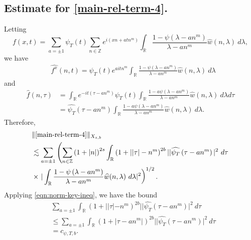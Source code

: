 \documentclass[12pt,reqno]{amsart}
\numberwithin{equation}{section}  %
\numberwithin{figure}{section}
\newcommand{\rr}{\mathbb{R}}
\newcommand{\zz}{\mathbb{Z}}
\newcommand{\wh}{\widehat}
\theoremstyle{plain}
\theoremstyle{definition}
\theoremstyle{remark}
\begin{document}
\subsection{Estimate for \eqref{main-rel-term-4}.}
Letting $$f(x,t) = \sum_{a = \pm 1} \psi_{T}(t) \sum_{n \in \zz} e^{i\left( xn +
atn^{m} \right)} 
\int_\rr \frac{1 - \psi\left( \lambda - an^{m} \right)}{\lambda - an^{m}} 
\wh{w} \left( n, \lambda \right) \ d \lambda,$$ we have
%
%
\begin{equation*}
	\begin{split}
		& \wh{f^x}(n, t) = \psi_{T}(t) e^{aitn^{m}} \int_\rr
		\frac{1 - \psi\left( \lambda - an^{m} \right)}{\lambda - an^{m}} 
		\wh{w}(n, \lambda) \ d \lambda
	\end{split}
\end{equation*}
and
\begin{equation*}
	\begin{split}
		 \wh{f}\left( n, \tau \right)
		 & = \int_\rr e^{-it\left( \tau - an^{m} 
		\right)} \psi_{T}(t) \int_\rr \frac{1 - a\psi\left( 
		\lambda - an^{m} 
		\right)}{\lambda - an^{m}} \wh{w}(n, \lambda) \ d \lambda d \tau
		\\
    & = \wh{\psi_{T}}\left( \tau - an^{m} \right) \int_\rr 
		\frac{1 - a\psi\left( 
		\lambda - an^{m} 
		\right)}{\lambda - an^{m}} \wh{w}(n, \lambda) \ d \lambda.
	\end{split}
\end{equation*}
Therefore,
%
%
\begin{equation}
  \label{iu}
	\begin{split}
		& \| \eqref{main-rel-term-4} \|_{X_{s,b}} 
		\\
    & \lesssim \sum_{a = \pm 1} \left( \sum_{n \in \zz} \left (1 + |n| \right
    )^{2s} \int_\rr \left( 1 + | |\tau| - n^{m } \right )^{2b} | | \wh{\psi_{T}}\left(
    \tau - an^{m } \right) |^2 \ d \tau \right.
		\\
		& \times \left . |
		\int_\rr \frac{1 - \psi\left( \lambda - an^{m } \right)}{\lambda -
		an^{m }} \wh{w}(n, \lambda) \ d \lambda |^2  \right)^{1/2}.
  \end{split}
\end{equation}
Applying \eqref{eqn:norm-key-ineq}, we have the bound
%
%
\begin{equation*}
\begin{split}
& \sum_{a = \pm 1} 
\int_\rr \left( 1 + | |\tau| - n^{m } \right )^{2b} | | \wh{\psi_{T}}\left(
    \tau - an^{m } \right) |^2 \ d \tau 
    \\
    & \le  \sum_{a = \pm 1} 
    \int_\rr \left( 1 + |\tau - an^{m } | \right )^{2b} | | \wh{\psi_{T}}\left(
    \tau - an^{m } \right) |^2 \ d \tau 
    \\
    & = c_{\psi, T, b}.
\end{split}
\end{equation*}
\end{document}
